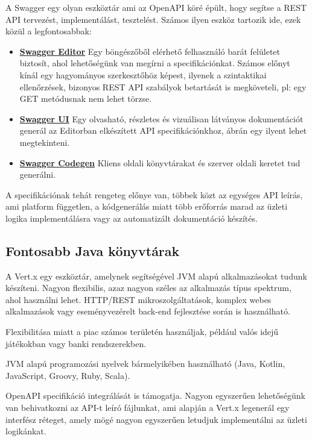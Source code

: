 A Swagger \cite{swagger.io} egy olyan eszköztár ami az OpenAPI köré épült, hogy segítse a REST API tervezést, implementálást, tesztelést. Számos ilyen eszköz tartozik ide, ezek közül a legfontosabbak:
\begin{itemize}
	\item \textbf{\href{https://editor.swagger.io/?_ga=2.32011518.1535494714.1606415394-1420243541.1606415394}{Swagger Editor}} Egy böngészőből elérhető felhasználó barát felületet biztosít, ahol lehetőségünk van megírni a specifikációnkat. Számos előnyt kínál egy hagyományos szerkesztőhöz képest, ilyenek a szintaktikai ellenőrzések, bizonyos REST API szabályok betartását is megköveteli, pl: egy GET metódusnak nem lehet törzse.
	\item  \textbf{\href{https://swagger.io/swagger-ui/}{Swagger UI}} Egy olvasható, részletes és vizuálisan látványos dokumentációt generál az Editorban elkészített API specifikációnkhoz,  ábrán egy ilyent lehet megtekinteni.
	\item  \textbf{\href{https://github.com/swagger-api/swagger-codegen}{Swagger Codegen}} Kliens oldali könyvtárakat és szerver oldali keretet tud generálni.
\end{itemize}

A specifikációnak tehát rengeteg előnye van, többek közt az egységes API leírás, ami platform független, a kódgenerálás miatt több erőforrás marad az üzleti logika implementálásra vagy  az automatizált dokumentáció készítés.
\subsection{Fontosabb Java könyvtárak}
A Vert.x \cite{vertx} egy eszköztár, amelynek segítségével JVM alapú alkalmazásokat tudunk készíteni. Nagyon flexibilis, azaz nagyon széles az alkalmazás típus spektrum, ahol használni lehet. HTTP/REST mikroszolgáltatások, komplex webes alkalmazások vagy eseményvezérelt back-end fejlesztése során is használható.

Flexibilitása miatt a piac számos területén használjak, például valós idejű játékokban vagy banki rendszerekben.

JVM alapú programozási nyelvek bármelyikében használható (Java, Kotlin, JavaScript, Groovy, Ruby, Scala).

OpenAPI specifikáció integrálását is támogatja. Nagyon egyszerűen lehetőségünk van behivatkozni az API-t leíró fájlunkat, ami alapján a Vert.x legenerál egy interfész réteget, amely mögé nagyon egyszerűen letudjuk implementálni az üzleti logikánkat.
